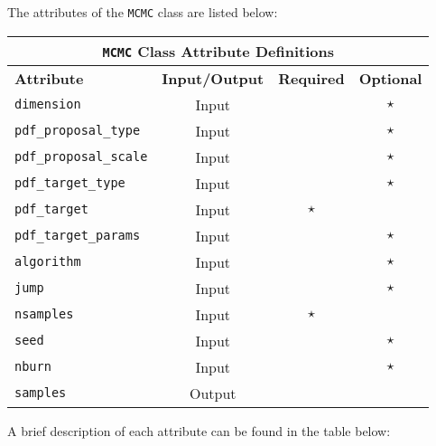 \documentclass[./UsersGuide.tex]{subfiles}
\begin{document}
\noindent
The attributes of the \texttt{MCMC} class are listed below:

\begin{center}
	\begin{tabular}{ |l|c|c|c| } 
				\hline
		\multicolumn{4}{|c|}{\texttt{MCMC} Class Attribute Definitions} \\
		\hline
		\textbf{Attribute} & \textbf{Input/Output} & \textbf{Required} & \textbf{Optional} \\
		\hline
		\texttt{dimension} & Input &  & $\star$  \\ 
		\hline
		\texttt{pdf\_proposal\_type} & Input & & $\star$   \\ 
		\hline
		\texttt{pdf\_proposal\_scale} & Input &  & $\star$  \\ 
		\hline
		\texttt{pdf\_target\_type}& Input &  &  $\star$  \\ 
		\hline
		\texttt{pdf\_target} & Input & $\star$ &   \\ 
		\hline
		\texttt{pdf\_target\_params} & Input  & &  $\star$  \\ 
		\hline
		\texttt{algorithm} & Input &  & $\star$  \\ 
		\hline
		\texttt{jump} & Input &  & $\star$  \\ 
		\hline
		\texttt{nsamples}& Input & $\star$ &    \\ 
		\hline
		\texttt{seed} & Input & & $\star$   \\ 
		\hline
		\texttt{nburn} & Input & & $\star$   \\ 
		\hline
		\texttt{samples} & Output & & \\
		\hline
	\end{tabular}%
\end{center}

\noindent
A brief description of each attribute can be found in the table below:
\end{document}
